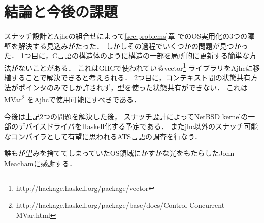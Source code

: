 \documentclass[submit,techreq,noauthor]{ipsj}
\begin{document}
\section{結論と今後の課題}

スナッチ設計とAjhcの組合せによって\ref{sec:problems}章
でのOS実用化の3つの障壁を解決する見込みがたった．
しかしその過程でいくつかの問題が見つかった．
1つ目に，C言語の構造体のように構造の一部を局所的に更新する簡単な方法がないことがある．
これはGHCで使われているvector\footnote{http://hackage.haskell.org/package/vector}
ライブラリをAjhcに移植することで解決できると考えられる．
2つ目に，コンテキスト間の状態共有方法がポインタのみでしか許されず，型を使った状態共有ができない．
これはMVar\footnote{http://hackage.haskell.org/package/base/docs/Control-Concurrent-MVar.html}
をAjhcで使用可能にすべきである．

今後は上記2つの問題を解決した後，
スナッチ設計によってNetBSD kernelの一部のデバイスドライバをHaskell化する予定である．
またjhc以外のスナッチ可能なコンパイラとして有望に思われるATS言語\cite{ats}の調査を行なう．

\begin{acknowledgment}
誰もが望みを捨ててしまっていたOS領域にかすかな光をもたらしたJohn Meachamに感謝する．
\end{acknowledgment}



\end{document}

